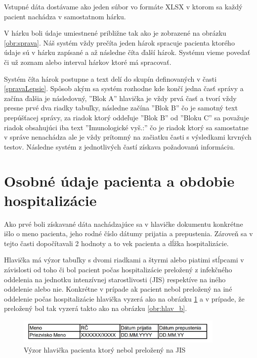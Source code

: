 Vstupné dáta dostávame ako jeden súbor vo formáte XLSX v ktorom sa každý pacient nachádza v samostatnom hárku.

V hárku boli údaje umiestnené približne tak ako je zobrazené na obrázku \ref{obr:sprava}. Náš systém vždy prečíta jeden hárok spracuje pacienta ktorého údaje sú v hárku zapísané a až následne číta ďalší hárok. Systému vieme povedať či už zoznam alebo interval hárkov ktoré má spracovať. 

Systém číta hárok postupne a text delí do skupín definovaných v časti \ref{spravaLepsie}. Spôsob akým sa systém rozhodne kde končí jedna časť správy a začína ďalšia je následovný, ''Blok A'' hlavička je vždy prvá časť a tvorí vždy presne prvé dva riadky tabuľky, následne začína ''Blok B'' čo je samotný text prepúšťacej správy, za riadok ktorý oddeľuje ''Blok B'' od ''Bloku C'' sa považuje riadok obsahujúci iba text ''Imunologické vyš.:'' čo je riadok ktorý sa samostatne v správe nenachádza ale je vždy prítomný na začiatku časti s výsledkami krvných testov. Následne systém z jednotlivých častí získava požadovanú informáciu.

\section{Osobné údaje pacienta a obdobie hospitalizácie}
\label{osobUdaj}
Ako prvé boli získavané dáta nachádzajúce sa v hlavičke dokumentu konkrétne išlo o meno pacienta, jeho rodné číslo dátumy prijatia a prepustenia. Zároveň sa v tejto časti dopočítavali 2 hodnoty a to vek pacienta a dĺžka hospitalizácie.

Hlavička má výzor tabuľky s dvomi riadkami a štyrmi alebo piatimi stĺpcami v závislosti od toho či bol pacient počas hospitalizácie preložený z infekčného oddelenia na jednotku intenzívnej starostlivosti (JIS) respektíve na iného oddelenie alebo nie. Konkrétne v prípade ak pacient nebol preložený na iné oddelenie počas hospitalizácie hlavička vyzerá ako na obrázku \ref{obr:hlav_a} a v prípade, že preložený bol tak vyzerá takto ako na obrázku \ref{obr:hlav_b}.  

\begin{figure}
	\centerline{\includegraphics[width=0.9\textwidth]{images/hlavicka_a}}
	\caption[Hlavička a)]{Výzor hlavička pacienta ktorý nebol preložený na JIS}
	\label{obr:hlav_a}
\end{figure}

